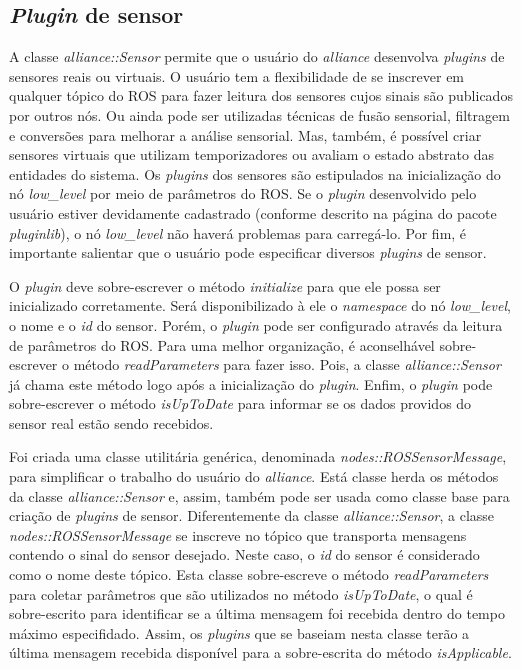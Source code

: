         \subsection{\textit{Plugin} de sensor} \label{subsec:alliance_sensor}
            A classe \textit{alliance::Sensor} permite que o usuário do \textit{alliance} desenvolva \textit{plugins} de sensores reais ou virtuais. O usuário tem a flexibilidade de se inscrever em qualquer tópico do ROS para fazer leitura dos sensores cujos sinais são publicados por outros nós. Ou ainda pode ser utilizadas técnicas de fusão sensorial, filtragem e conversões para melhorar a análise sensorial. Mas, também, é possível criar sensores virtuais que utilizam temporizadores ou avaliam o estado abstrato das entidades do sistema. Os \textit{plugins} dos sensores são estipulados na inicialização do nó \textit{low\_level} por meio de parâmetros do ROS. Se o \textit{plugin} desenvolvido pelo usuário estiver devidamente cadastrado (conforme descrito na página do pacote \textit{pluginlib}), o nó \textit{low\_level} não haverá problemas para carregá-lo. Por fim, é importante salientar que o usuário pode especificar diversos \textit{plugins} de sensor.
            
            
            
            O \textit{plugin} deve sobre-escrever o método \textit{initialize} para que ele possa ser inicializado corretamente. Será disponibilizado à ele o \textit{namespace} do nó \textit{low\_level}, o nome e o \textit{id} do sensor. Porém, o \textit{plugin} pode ser configurado através da leitura de parâmetros do ROS. Para uma melhor organização, é aconselhável sobre-escrever o método \textit{readParameters} para fazer isso. Pois, a classe \textit{alliance::Sensor} já chama este método logo após a inicialização do \textit{plugin}. Enfim, o \textit{plugin} pode sobre-escrever o método \textit{isUpToDate} para informar se os dados providos do sensor real estão sendo recebidos. 
            
            Foi criada uma classe utilitária genérica, denominada \textit{nodes::ROSSensorMessage}, para simplificar o trabalho do usuário do \textit{alliance}. Está classe herda os métodos da classe \textit{alliance::Sensor} e, assim, também pode ser usada como classe base para criação de \textit{plugins} de sensor. Diferentemente da classe \textit{alliance::Sensor}, a classe \textit{nodes::ROSSensorMessage} se inscreve no tópico que transporta mensagens contendo o sinal do sensor desejado. Neste caso, o \textit{id} do sensor é considerado como o nome deste tópico. Esta classe sobre-escreve o método \textit{readParameters} para coletar parâmetros que são utilizados no método \textit{isUpToDate}, o qual é sobre-escrito para identificar se a última mensagem foi recebida dentro do tempo máximo especifidado. Assim, os \textit{plugins} que se baseiam nesta classe terão a última mensagem recebida disponível para a sobre-escrita do método \textit{isApplicable}.
        
